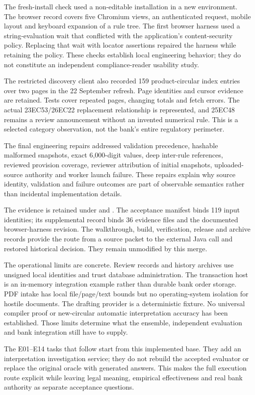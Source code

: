 The fresh-install check used a non-editable installation in a new environment.
The browser record covers five Chromium views, an authenticated request, mobile
layout and keyboard expansion of a rule tree. The first browser harness used a
string-evaluation wait that conflicted with the application's content-security
policy. Replacing that wait with locator assertions repaired the harness while
retaining the policy. These checks establish local engineering behavior; they
do not constitute an independent compliance-reader usability study.

The restricted discovery client also recorded 159 product-circular index
entries over two pages in the 22 September refresh. Page identities and cursor
evidence are retained. Tests cover repeated pages, changing totals and fetch
errors. The actual 23EC53/26EC22 replacement relationship is represented, and
25EC48 remains a review announcement without an invented numerical rule. This
is a selected category observation, not the bank's entire regulatory perimeter.

The final engineering repairs addressed validation precedence, hashable malformed
snapshots, exact 6,000-digit values, deep inter-rule references, reviewed provision
coverage, reviewer attribution of initial snapshots, uploaded-source authority
and worker launch failure. These repairs explain why source identity, validation
and failure outcomes are part of observable semantics rather than incidental
implementation details.

The evidence is retained under  and
. The acceptance manifest binds 119 input
identities; its supplemental record binds 36 evidence files and the documented
browser-harness revision. The walkthrough, build, verification, release and
archive records provide the route from a source packet to the external Java
call and restored historical decision. They remain unmodified by this merge.

The operational limits are concrete. Review records and history archives use
unsigned local identities and trust database administration. The transaction
host is an in-memory integration example rather than durable bank order
storage. PDF intake has local file/page/text bounds but no operating-system
isolation for hostile documents. The drafting provider is a deterministic
fixture. No universal compiler proof or new-circular automatic interpretation
accuracy has been established. Those limits determine what the ensemble,
independent evaluation and bank integration still have to supply.

The E01--E14 tasks that follow start from this implemented base. They add an
interpretation investigation service; they do not rebuild the accepted evaluator
or replace the original oracle with generated answers. This makes the full
execution route explicit while leaving legal meaning, empirical effectiveness
and real bank authority as separate acceptance questions.
